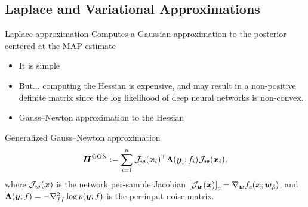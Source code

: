 \documentclass[9pt]{beamer}
\begin{document}
\subsection{Laplace and Variational Approximations}

\begin{frame}{Laplace approximation}
Computes a Gaussian approximation to the posterior centered at the MAP estimate

\begin{itemize}
	\item It is simple
	\item But... computing the Hessian is expensive, and may result in a non-positive definite matrix since the log likelihood of deep neural networks is non-convex.
	\item Gauss--Newton approximation to the Hessian
\end{itemize}

\begin{block}{Generalized Gauss--Newton approximation}
	$$\boldsymbol{H}^{\mathrm{GGN}}:= \sum_{i=1}^n \mathcal{J}_{\boldsymbol{w}}(\boldsymbol{x}_i)^{\top}\boldsymbol{\Lambda}(\boldsymbol{y}_i;f_i)\mathcal{J}_{\boldsymbol{w}}(\boldsymbol{x}_i),$$
where $\mathcal{J}_{\boldsymbol{w}}(\boldsymbol{x})$ is the network per-sample Jacobian $\left[\mathcal{J}_{\boldsymbol{w}}(\boldsymbol{x})\right]_{c}=\nabla_{\boldsymbol{w}}f_c(\boldsymbol{x};\boldsymbol{w}_{\hat{\rho}})$, and $\boldsymbol{\Lambda}(\boldsymbol{y};f)=-\nabla^2_{ff}\log p(\boldsymbol{y};f)$ is the per-input noise matrix.%
\end{block}

\end{frame}
\end{document}
